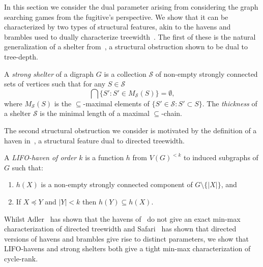 \documentclass{llncs}
\newcommand{\letters}[1]{\{\!|#1|\!\}}
\newcommand{\st}{\mathrel{:}}
\begin{document}
In this section we consider the dual parameter arising from considering the graph searching games from the fugitive's perspective.  We show that it can be characterized by two types of structural features, akin to the havens and brambles used to dually characterize treewidth~\cite{ST93}.  The first of these is the natural generalization of a shelter from~\cite{GT11}, a structural obstruction shown to be dual to tree-depth.

\begin{definition}
A \emph{strong shelter} of a digraph $G$ is a collection $\mathcal{S}$ of non-empty strongly connected sets of vertices such that for any $S \in \mathcal{S}$ 
\[\bigcap \{S' \st S' \in M_{\mathcal{S}}(S)\}  = \emptyset,\]  where $M_{\mathcal{S}}(S)$ is the $\subseteq$-maximal elements of $\{S' \in \mathcal{S}\st S' \subset S\}$.  
The \emph{thickness} of a shelter $\mathcal{S}$ is the minimal length of a maximal $\subseteq$-chain.
\end{definition}


The second structural obstruction we consider is motivated by the definition of a haven in~\cite{JRST01}, a structural feature dual to directed treewidth.

\begin{definition}
A \emph{LIFO-haven of order $k$} is a function $h$ from $V(G)^{<k}$ to induced subgraphs of $G$ such that:
\begin{enumerate}[(H1) ]
\item $h(X)$ is a non-empty strongly connected component of $G \setminus \letters{X}$, and
\item If $X \preceq Y$ and $|Y| < k$ then $h(Y) \subseteq h(X)$.
\end{enumerate}
\end{definition}

Whilst Adler~\cite{Adl05} has shown that the havens of~\cite{JRST01} do not give an exact min-max characterization of directed treewidth and Safari~\cite{Saf05} has shown that directed versions of havens and brambles give rise to distinct parameters, we show that LIFO-havens and strong shelters both give a tight min-max characterization of cycle-rank.
\end{document}
